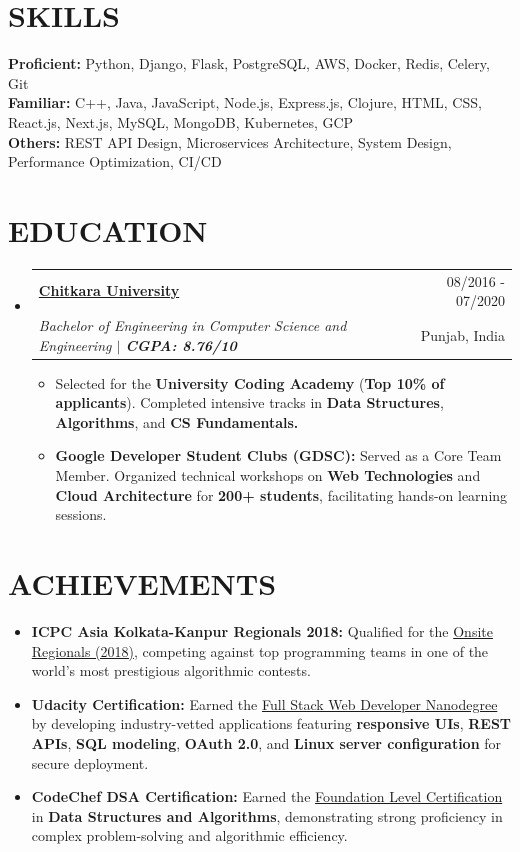 \documentclass[letterpaper,11pt]{article}
\makeatletter
\newcommand{\resumeItem}[1]{
  \item\small{
    {#1 \vspace{-1pt}}
  }
}
\newcommand{\resumeSubheading}[4]{
  \vspace{-1pt}\item
    \begin{tabular*}{\textwidth}[t]{l@{\extracolsep{\fill}}r}
      \textbf{#1} & {\color{dark-grey}\small #2}\vspace{1pt}\\ %
      \textit{#3} & {\color{dark-grey} \small #4}\\ %
    \end{tabular*}\vspace{-4pt}
}
\newcommand{\resumeSubHeadingListStart}{\begin{itemize}[leftmargin=0in, label={}]}
\newcommand{\resumeSubHeadingListEnd}{\end{itemize}}
\newcommand{\resumeItemListStart}{\begin{itemize}}
\newcommand{\resumeItemListEnd}{\end{itemize}\vspace{0pt}}
\makeatother
\begin{document}
\section{SKILLS}
 \begin{itemize}[leftmargin=0in, label={}]
    \small{\item{
     \textbf{Proficient:} {Python, Django, Flask, PostgreSQL, AWS, Docker, Redis, Celery, Git}\vspace{2pt} \\
     \textbf{Familiar:} {C++, Java, JavaScript, Node.js, Express.js, Clojure, HTML, CSS, React.js, Next.js, MySQL, MongoDB, Kubernetes, GCP}\vspace{2pt} \\
     \textbf{Others:} {REST API Design, Microservices Architecture, System Design, Performance Optimization, CI/CD}
    }}
 \end{itemize}



\section {EDUCATION}
  \resumeSubHeadingListStart
    \resumeSubheading
      {\href{https://www.chitkara.edu.in/}{Chitkara University}}{08/2016 - 07/2020}
      {Bachelor of Engineering in Computer Science and Engineering $|$ \textbf{CGPA: 8.76/10}}{Punjab, India}
    \resumeItemListStart
        \resumeItem{Selected for the \textbf{University Coding Academy} (\textbf{Top 10\% of applicants}). Completed intensive tracks in \textbf{Data Structures}, \textbf{Algorithms}, and \textbf{CS Fundamentals.}}
        \resumeItem{\textbf{Google Developer Student Clubs (GDSC):} Served as a Core Team Member. Organized technical workshops on \textbf{Web Technologies} and \textbf{Cloud Architecture} for \textbf{200+ students}, facilitating hands-on learning sessions.}
    \resumeItemListEnd
  \resumeSubHeadingListEnd


%

\section{ACHIEVEMENTS}
  \resumeItemListStart
    \resumeItem{\textbf{ICPC Asia Kolkata-Kanpur Regionals 2018:} Qualified for the \href{https://icpc.global/ICPCID/NKANW920C4X3/}{Onsite Regionals (2018)}, competing against top programming teams in one of the world's most prestigious algorithmic contests.}
    \resumeItem{\textbf{Udacity Certification:} Earned the \href{https://www.udacity.com/certificate/9TACEKES}{Full Stack Web Developer Nanodegree} by developing industry-vetted applications featuring \textbf{responsive UIs}, \textbf{REST APIs}, \textbf{SQL modeling}, \textbf{OAuth 2.0}, and \textbf{Linux server configuration} for secure deployment.}
    \resumeItem{\textbf{CodeChef DSA Certification:} Earned the \href{https://www.codechef.com/certificates/public/bc2d46c/}{Foundation Level Certification} in \textbf{Data Structures and Algorithms}, demonstrating strong proficiency in complex problem-solving and algorithmic efficiency.}
  \resumeItemListEnd

\end{document}
